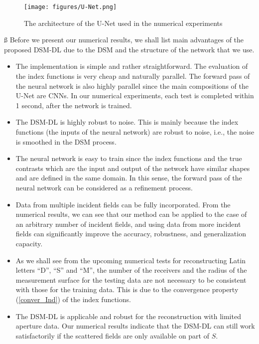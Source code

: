 \documentclass{article}
\begin{document}
\begin{figure}[htp]
	\centering
	\texttt{[image: figures/U-Net.png]}
	\caption{The architecture of the U-Net used in the numerical experiments}
	\label{fig:UNet}
\end{figure}
	
\ss 
Before we present our numerical results, we shall list main advantages of the proposed DSM-DL due to the DSM and the structure of the network that we use. 
\begin{itemize}
	\item The implementation is simple and rather straightforward. The evaluation of the index functions is very cheap and naturally parallel. The forward pass of the neural network is also highly parallel since the main compositions of the U-Net are CNNs. In our numerical experiments, each test is completed within 1 second, after the network is trained.
 
	\item The DSM-DL is highly robust to noise. This is mainly because the index functions (the inputs of the neural network) are robust to noise, i.e., the noise is smoothed in the DSM process.
 
	\item The neural network is easy to train since the index functions and the true contrasts which are the input and output of the network have similar shapes and are defined in the same domain. In this sense, the forward pass of the neural network can be considered as a refinement process. 

    \item Data from multiple incident fields can be fully incorporated. From the numerical results, we can see that our method can be applied to the case of an arbitrary number of incident fields, and using data from more incident fields can significantly improve the accuracy, robustness, and generalization capacity.

    \item As we shall see from the upcoming numerical tests for reconstructing Latin letters “D”, “S” and “M”, the number of the receivers and the radius of the measurement surface for the testing data are not necessary to be consistent with those for the training data. This is due to the convergence property (\ref{conver_Ind}) of the index functions.
 
    \item The DSM-DL is applicable and robust for the reconstruction with limited aperture data. 
Our numerical results indicate that the DSM-DL can still work satisfactorily if the scattered fields are 
only available on part of $S$.
\end{itemize}
	
\end{document}
